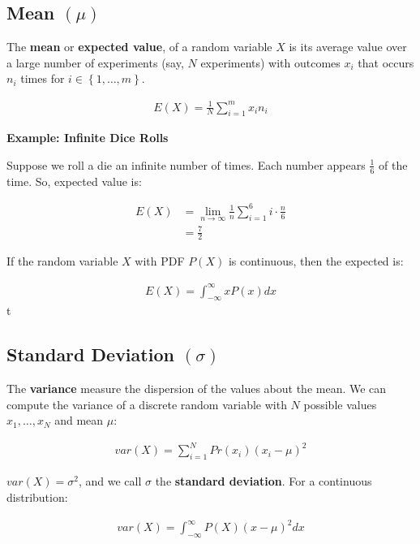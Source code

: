 \documentclass[11pt]{article}
\begin{document}
\subsection{Mean \(\left( \mu \right)\)}
\label{sec:orga7b41a5}
The \textbf{mean} or \textbf{expected value}, of a random variable \(X\) is its average value over a large number of experiments (say, \(N\) experiments) with outcomes \(x_{i}\) that occurs \(n_{i}\) times for \(i \in \left\lbrace 1, \ldots, m \right\rbrace\).

\begin{align*}
    E\left( X \right) = \frac{1}{N}\sum_{i=1}^{m}x_{i}n_{i}
\end{align*}

\textbf{Example: Infinite Dice Rolls}

Suppose we roll a die an infinite number of times. Each number appears \(\frac{1}{6}\) of the time. So, expected value is:

\begin{align*}
    E\left( X \right) &= \lim_{n \rightarrow \infty} \frac{1}{n}\sum_{i=1}^{6} i \cdot \frac{n}{6} \\
    &= \frac{7}{2}
\end{align*}

If the random variable \(X\) with PDF \(P\left( X \right)\) is continuous, then the expected is:

\begin{align*}
    E\left( X \right) = \int_{-\infty}^{\infty} xP\left( x \right)dx
\end{align*}
t
\subsection{Standard Deviation \(\left( \sigma \right)\)}
\label{sec:org71fc6f2}
The \textbf{variance} measure the dispersion of the values about the mean. We can compute the variance of a discrete random variable with \(N\) possible values \(x_{1}, \ldots, x_{N}\) and mean \(\mu\):

\begin{align*}
    var\left( X \right) = \sum_{i=1}^{N} Pr\left( x_{i} \right)\left( x_{i} - \mu \right)^{2}
\end{align*}

\(var\left( X \right) = \sigma^{2}\), and we call \(\sigma\) the \textbf{standard deviation}. For a continuous distribution:

\begin{align*}
    var\left( X \right) = \int_{-\infty}^{\infty} P\left( X \right)\left( x - \mu \right)^{2}dx
\end{align*}
\end{document}
